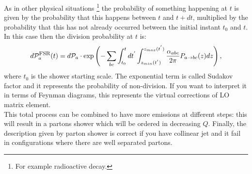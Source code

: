 As in other physical situations \footnote{For example radioactive decay.} the probability of something happening at $ t $ is given by the probability that this happens between $ t $ and $ t + dt $, multiplied by the probability that this has not already occurred between the initial instant $ t_0 $ and $ t $.
In this case then the  division probability  at $ t $ is:
\begin{equation}
 d \mathcal{P}_{a}^{\mbox{\footnotesize{FSR}}}(t)=   d \mathcal{P}_{a} \cdot \mbox{exp} \left(   -\sum_{bc} \int_{t_0}^t dt^{'}  \int_{z_{min}(t^{'})}^{{z_{max}(t^{'})}} \frac{\alpha_{abc}}{2 \pi} P_{a \rightarrow bc}(z) dz \right) \mbox{,}\end{equation}
where $t_{0}$ is the shower starting scale. 
The exponential term is called Sudakov factor and it represents the probability of non-division. 
If you want to interpret it in terms of Feynman diagrams, this represents the virtual corrections of LO matrix element. \\
This total process can be combined to have more emissions at different steps: this will result in a partons  shower which will be ordered in decreasing $ Q $. 
Finally,  the description given by parton shower is correct if you have collinear jet and it fail in configurations where there are well separated partons.   

